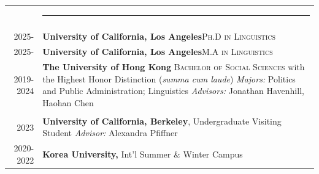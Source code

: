 \documentclass[letterpaper, 11pt]{article}
\newcommand{\headingfont}{\Large\color{black}}
\newenvironment{SectionTableSingleSpace}[1]{
	\renewcommand*{\arraystretch}{1.3}
	\setlength{\tabcolsep}{10pt}
	\begin{longtable}{Rp{6.3in}} & #1 \vspace{0.13cm}\hrule \\[0.6em] }
{\end{longtable}\vspace{-.3cm}}
\begin{document}
\begin{SectionTableSingleSpace}{\headingfont{\textbf{Education}}}
&
{}\\
\raggedright{\scriptsize{2025-}} &
\textbf{University of California, Los Angeles}\newline \textsc{Ph.D in Linguistics} \vspace{0.3cm}\\

\raggedright{\scriptsize{2025-}} &
\textbf{University of California, Los Angeles}\newline \textsc{M.A in Linguistics} \vspace{0.3cm}\\

\raggedright{\scriptsize{2019-2024}} &
\textbf{The University of Hong Kong}\newline
\textsc{Bachelor of Social Sciences} with the Highest Honor Distinction (\textit{summa cum laude})\newline
\textit{Majors:} Politics and Public Administration; Linguistics\newline
\textit{Advisors:} Jonathan Havenhill, Haohan Chen \vspace{0.3cm}\\

&
{}\\

\raggedright{\scriptsize{2023}} &
\textbf{University of California, Berkeley}, Undergraduate Visiting Student \newline
\textit{Advisor:} Alexandra Pfiffner\\

\raggedright{\scriptsize{2020-2022}}&
\textbf{Korea University,} {Int'l Summer \& Winter Campus}\\

\end{SectionTableSingleSpace}
\end{document}
